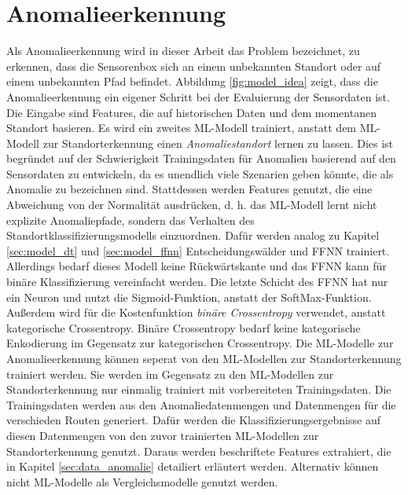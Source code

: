 \newpage
\section{Anomalieerkennung}
Als Anomalieerkennung wird in dieser Arbeit das Problem bezeichnet, zu erkennen, dass die Sensorenbox sich an einem
unbekannten Standort oder auf einem unbekannten Pfad befindet.
Abbildung \ref{fig:model_idea} zeigt, dass die Anomalieerkennung ein eigener Schritt bei der Evaluierung der Sensordaten ist.
Die Eingabe sind Features, die auf historischen Daten und dem momentanen Standort basieren.
\newline
\newline
Es wird ein zweites ML-Modell trainiert, anstatt dem ML-Modell zur Standorterkennung einen \textit{Anomaliestandort} lernen zu lassen.
Dies ist begründet auf der Schwierigkeit Trainingsdaten für Anomalien basierend auf den Sensordaten zu entwickeln,
da es unendlich viele Szenarien geben könnte, die als Anomalie zu bezeichnen sind.
Stattdessen werden Features genutzt, die eine Abweichung von der Normalität ausdrücken,
d. h. das ML-Modell lernt nicht explizite Anomaliepfade, sondern das Verhalten des Standortklassifizierungsmodells einzuordnen.
\newline
\newline
Dafür werden analog zu Kapitel \ref{sec:model_dt} und \ref{sec:model_ffnn} Entscheidungswälder und FFNN trainiert.
Allerdings bedarf dieses Modell keine Rückwärtskante und das FFNN kann für binäre Klassifizierung vereinfacht werden.
Die letzte Schicht des FFNN hat nur ein Neuron und nutzt die Sigmoid-Funktion, anstatt der SoftMax-Funktion.
Außerdem wird für die Kostenfunktion \textit{binäre Crossentropy} verwendet, anstatt kategorische Crossentropy.
Binäre Crossentropy bedarf keine kategorische Enkodierung im Gegensatz zur kategorischen Crossentropy.
\newline
\newline
Die ML-Modelle zur Anomalieerkennung können seperat von den ML-Modellen zur Standorterkennung trainiert werden.
Sie werden im Gegensatz zu den ML-Modellen zur Standorterkennung nur einmalig trainiert mit vorbereiteten Trainingsdaten.
Die Trainingsdaten werden aus den Anomaliedatenmengen und Datenmengen für die verschieden Routen generiert.
Dafür werden die Klassifizierungsergebnisse auf diesen Datenmengen von den zuvor trainierten ML-Modellen zur Standorterkennung genutzt.
Daraus werden beschriftete Features extrahiert, die in Kapitel \ref{sec:data_anomalie} detailiert erläutert werden.
\newpage
Alternativ können nicht ML-Modelle als Vergleichsmodelle genutzt werden.
